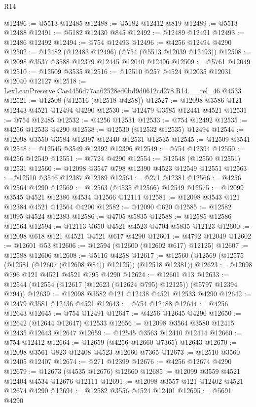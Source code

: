 \begin{lexlean}{R14}
\begin{coremodule}
@12486 := @5513 @12485
@12488 := @5182 @12412 @819
@12489 := @5513 @12488
@12491 := @5182 @12430 @845
@12492 := @12489 @12491
@12493 := @12486 @12492
@12494 := @754 @12493
@12496 := @4256 @12494 @4290
@12502 := @12482 (@12483 @12496) (@754 (@5513 @12039 @12493))
@12508 := @12098 @3537 @3588 @12379 @12445 @12040 @12496
@12509 := @5761 @12049
@12510 := @12509 @3535
@12516 := @12510 @257 @4524 @12035 @12031 @12040 @12127
@12518 := LexLeanPreserve.Cae4456d77aa62528ed0bd9d0612cd278.R14.__rel_46 @4533
@12521 := @12508 (@12516 (@12518 @4258))
@12527 := @12098 @3586 @121 @12443 @4521 @12494 @4290
@12530 := @12479 @3585 @12441 @4521
@12531 := @754 @12485
@12532 := @4256 @12531
@12533 := @754 @12492
@12535 := @4256 @12533 @4290
@12538 := @12530 (@12532 @12535) @12494
@12544 := @12098 @3550 @3584 @12397 @12440 @12531 @12535
@12545 := @12509 @3541
@12548 := @12545 @3549 @12392 @12396
@12549 := @754 @12394
@12550 := @4256 @12549
@12551 := @7724 @4290
@12554 := @12548 (@12550 @12551) @12531
@12560 := @12098 @3547 @798 @12390 @4523 @12549 @12551
@12563 := @12510 @3546 @12387 @12389
@12564 := @271 @12381
@12566 := @4256 @12564 @4290
@12569 := @12563 (@4535 @12566) @12549
@12575 := @12099 @3545 @4521 @12386 @4534 @12566 @12111
@12581 := @12098 @3543 @121 @12384 @4521 @12564 @4290
@12582 := @12090 @620
@12585 := @12582 @1095 @4524 @12383
@12586 := @4705 @5835
@12588 := @12585 @12586 @12564
@12594 := @12113 @650 @4521 @4523 @4704 @5835 @12123
@12600 := @12098 @618 @121 @4521 @4521 @617 @4290
@12601 := @4792 @12049
@12602 := @12601 @53
@12606 := @12594 (@12600 (@12602 @617) @12125)
@12607 := @12588 @12606
@12608 := @5116 @4258
@12617 := @12560 (@12569 (@12575 (@12581 (@12607 (@12608 @84)) @12125)) (@12518 @12381))
@12623 := @12098 @796 @121 @4521 @4521 @795 @4290
@12624 := @12601 @13
@12633 := @12544 (@12554 (@12617 (@12623 (@12624 @795) @12125)) (@5797 @12394 @794))
@12639 := @12098 @3582 @121 @12438 @4521 @12533 @4290
@12642 := @12479 @3581 @12436 @4521
@12643 := @754 @12488
@12644 := @4256 @12643
@12645 := @754 @12491
@12647 := @4256 @12645 @4290
@12650 := @12642 (@12644 @12647) @12533
@12656 := @12098 @3564 @3580 @12415 @12435 @12643 @12647
@12659 := @12545 @3563 @12410 @12414
@12660 := @754 @12412
@12664 := @12659 (@4256 @12660 @7365) @12643
@12670 := @12098 @3561 @823 @12408 @4523 @12660 @7365
@12673 := @12510 @3560 @12405 @12407
@12674 := @271 @12399
@12676 := @4256 @12674 @4290
@12679 := @12673 (@4535 @12676) @12660
@12685 := @12099 @3559 @4521 @12404 @4534 @12676 @12111
@12691 := @12098 @3557 @121 @12402 @4521 @12674 @4290
@12694 := @12582 @3556 @4524 @12401
@12695 := @5691 @4290

\end{coremodule}
\end{lexlean}
